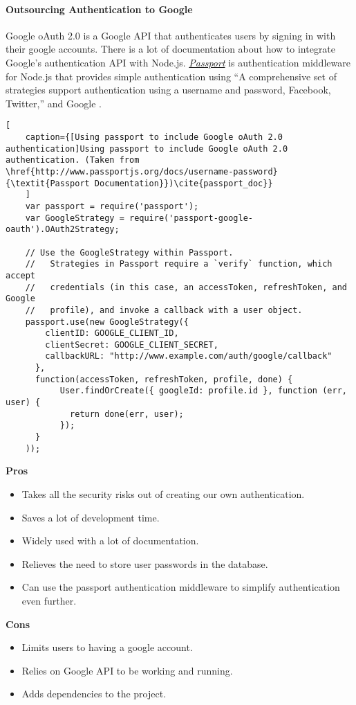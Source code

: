 \paragraph{Outsourcing Authentication to Google}
Google oAuth 2.0 is a Google API that authenticates users by signing in with their google accounts. There is a lot of documentation about how to integrate Google's authentication API with Node.js. \href{http://www.passportjs.org/}{\textit{Passport}} is authentication middleware for Node.js that provides simple authentication using ``A comprehensive set of strategies support authentication using a username and password, Facebook, Twitter,'' and Google \cite{passport}.
\begin{lstlisting}[
    caption={[Using passport to include Google oAuth 2.0 authentication]Using passport to include Google oAuth 2.0 authentication. (Taken from \href{http://www.passportjs.org/docs/username-password}{\textit{Passport Documentation}})\cite{passport_doc}}
    ]
    var passport = require('passport');
    var GoogleStrategy = require('passport-google-oauth').OAuth2Strategy;
    
    // Use the GoogleStrategy within Passport.
    //   Strategies in Passport require a `verify` function, which accept
    //   credentials (in this case, an accessToken, refreshToken, and Google
    //   profile), and invoke a callback with a user object.
    passport.use(new GoogleStrategy({
        clientID: GOOGLE_CLIENT_ID,
        clientSecret: GOOGLE_CLIENT_SECRET,
        callbackURL: "http://www.example.com/auth/google/callback"
      },
      function(accessToken, refreshToken, profile, done) {
           User.findOrCreate({ googleId: profile.id }, function (err, user) {
             return done(err, user);
           });
      }
    ));
\end{lstlisting}
\textbf{Pros}
\begin{itemize}
    \item Takes all the security risks out of creating our own authentication.
    \item Saves a lot of development time. 
    \item Widely used with a lot of documentation.
    \item Relieves the need to store user passwords in the database.
    \item Can use the passport authentication middleware to simplify authentication even further.
\end{itemize}
\textbf{Cons} 
\begin{itemize}
    \item Limits users to having a google account.
    \item Relies on Google API to be working and running.
    \item Adds dependencies to the project.
\end{itemize}
